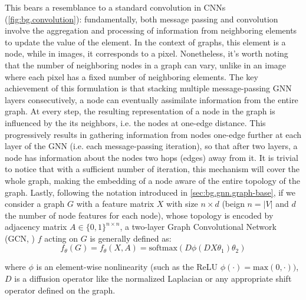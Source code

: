 \documentclass[binding=0.6cm]{sapthesis}
\begin{document}
This bears a resemblance to a standard convolution in CNNs (\cref{fig:bg.convolution}): fundamentally, both message passing and convolution involve the aggregation and processing of information from neighboring elements to update the value of the element. In the context of graphs, this element is a node, while in images, it corresponds to a pixel. Nonetheless, it's worth noting that the number of neighboring nodes in a graph can vary, unlike in an image where each pixel has a fixed number of neighboring elements. The key achievement of this formulation is that stacking multiple message-passing GNN layers consecutively, a node can eventually assimilate information from the entire graph. At every step, the resulting representation of a node in the graph is influenced by the its neighbors, i.e. the nodes at one-edge distance. This progressively results in gathering information from nodes one-edge further at each layer of the GNN (i.e. each message-passing iteration), so that after two layers, a node has information about the nodes two hops (edges) away from it. It is trivial to notice that with a sufficient number of iteration, this mechanism will cover the whole graph, making the embedding of a node aware of the entire topology of the graph. Lastly, following the notation introduced in \cref{sec:bg.gnn.graph-base}, if we consider a graph $G$ with a feature matrix $X$ with size $n\times d$ (beign $n = |V|$ and $d$ the number of node features for each node), whose topology is encoded by adjacency matrix $A \in \{0,1\}^{n\times n}$, a two-layer Graph Convolutional Network (GCN, \cite{kipf2016-semisupervised}) $f$ acting on $G$ is generally defined as:
\begin{equation}
    f_{\theta}(G) = f_{\theta}(X,A) = \text{softmax}(D\phi(DX\theta_1)\theta_2) 
\end{equation}

where $\phi$ is an element-wise nonlinearity (such as the ReLU $\phi(\cdot) = \text{max}(0, \cdot))$, $D$ is a diffusion operator like the normalized Laplacian or any appropriate shift operator defined on the graph.
\end{document}
